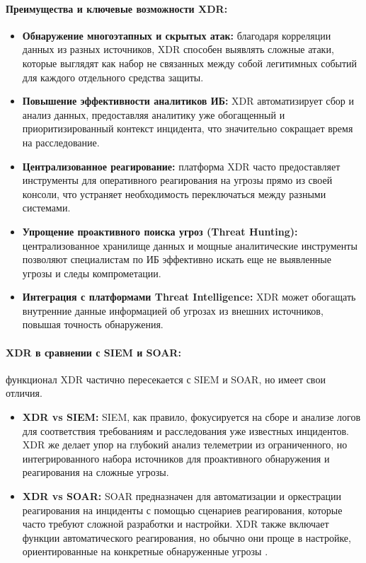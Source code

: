\paragraph*{Преимущества и ключевые возможности XDR:}
\begin{itemize}
    \item \textbf{Обнаружение многоэтапных и скрытых атак:} благодаря корреляции данных из разных источников, XDR способен выявлять сложные атаки, которые выглядят как набор не связанных между собой легитимных событий для каждого отдельного средства защиты.
    \item \textbf{Повышение эффективности аналитиков ИБ:} XDR автоматизирует сбор и анализ данных, предоставляя аналитику уже обогащенный и приоритизированный контекст инцидента, что значительно сокращает время на расследование.
    \item \textbf{Централизованное реагирование:} платформа XDR часто предоставляет инструменты для оперативного реагирования на угрозы прямо из своей консоли, что устраняет необходимость переключаться между разными системами.
    \item \textbf{Упрощение проактивного поиска угроз (Threat Hunting):} централизованное хранилище данных и мощные аналитические инструменты позволяют специалистам по ИБ эффективно искать еще не выявленные угрозы и следы компрометации.
    \item \textbf{Интеграция с платформами Threat Intelligence:} XDR может обогащать внутренние данные информацией об угрозах из внешних источников, повышая точность обнаружения.
\end{itemize}

\paragraph{XDR в сравнении с SIEM и SOAR:} функционал XDR частично пересекается с SIEM и SOAR, но имеет свои отличия.
\begin{itemize}
    \item \textbf{XDR vs SIEM:} SIEM, как правило, фокусируется на сборе и анализе логов для соответствия требованиям и расследования уже известных инцидентов. XDR же делает упор на глубокий анализ телеметрии из ограниченного, но интегрированного набора источников для проактивного обнаружения и реагирования на сложные угрозы.
    \item \textbf{XDR vs SOAR:} SOAR предназначен для автоматизации и оркестрации реагирования на инциденты с помощью сценариев реагирования, которые часто требуют сложной разработки и настройки. XDR также включает функции автоматического реагирования, но обычно они проще в настройке, ориентированные на конкретные обнаруженные угрозы \cite{KasperskyXDR}.
\end{itemize}

